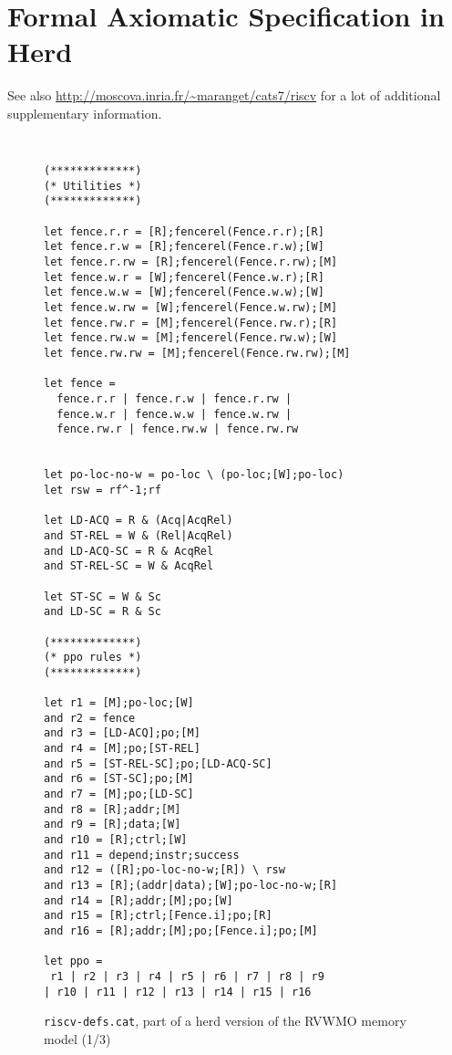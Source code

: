 \clearpage
\section{Formal Axiomatic Specification in Herd}

See also \url{http://moscova.inria.fr/~maranget/cats7/riscv} for a lot of additional supplementary information.

\begin{figure}[h!]
  {
  \tt\bfseries\centering\footnotesize
  \begin{lstlisting}
(*************)
(* Utilities *)
(*************)

let fence.r.r = [R];fencerel(Fence.r.r);[R]
let fence.r.w = [R];fencerel(Fence.r.w);[W]
let fence.r.rw = [R];fencerel(Fence.r.rw);[M]
let fence.w.r = [W];fencerel(Fence.w.r);[R]
let fence.w.w = [W];fencerel(Fence.w.w);[W]
let fence.w.rw = [W];fencerel(Fence.w.rw);[M]
let fence.rw.r = [M];fencerel(Fence.rw.r);[R]
let fence.rw.w = [M];fencerel(Fence.rw.w);[W]
let fence.rw.rw = [M];fencerel(Fence.rw.rw);[M]

let fence = 
  fence.r.r | fence.r.w | fence.r.rw |
  fence.w.r | fence.w.w | fence.w.rw |
  fence.rw.r | fence.rw.w | fence.rw.rw


let po-loc-no-w = po-loc \ (po-loc;[W];po-loc)
let rsw = rf^-1;rf

let LD-ACQ = R & (Acq|AcqRel)
and ST-REL = W & (Rel|AcqRel)
and LD-ACQ-SC = R & AcqRel
and ST-REL-SC = W & AcqRel

let ST-SC = W & Sc
and LD-SC = R & Sc

(*************)
(* ppo rules *)
(*************)

let r1 = [M];po-loc;[W]
and r2 = fence
and r3 = [LD-ACQ];po;[M]
and r4 = [M];po;[ST-REL]
and r5 = [ST-REL-SC];po;[LD-ACQ-SC]
and r6 = [ST-SC];po;[M]
and r7 = [M];po;[LD-SC]
and r8 = [R];addr;[M]
and r9 = [R];data;[W]
and r10 = [R];ctrl;[W]
and r11 = depend;instr;success
and r12 = ([R];po-loc-no-w;[R]) \ rsw
and r13 = [R];(addr|data);[W];po-loc-no-w;[R]
and r14 = [R];addr;[M];po;[W]
and r15 = [R];ctrl;[Fence.i];po;[R]
and r16 = [R];addr;[M];po;[Fence.i];po;[M]

let ppo =
 r1 | r2 | r3 | r4 | r5 | r6 | r7 | r8 | r9
| r10 | r11 | r12 | r13 | r14 | r15 | r16
\end{lstlisting}
  }
  \caption{{\tt riscv-defs.cat}, part of a herd version of the RVWMO memory model (1/3)}
  \label{fig:herd1}
\end{figure}


